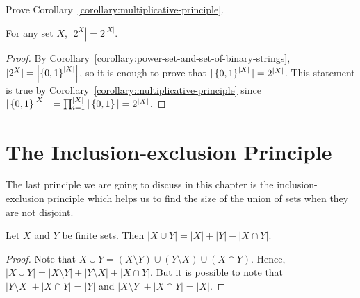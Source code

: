 \begin{exercise}
  Prove Corollary~\ref{corollary:multiplicative-principle}.
\end{exercise}

\begin{theorem}
\label{theorem:cardinality-of-power-set}
  For any set $X$, $|2^X| = 2^{|X|}$.
\end{theorem}
\begin{proof}
  By Corollary~\ref{corollary:power-set-and-set-of-binary-strings}, $|2^X| =
  \left|\set{0, 1}^{|X|}\right|$, so it is enough to prove that
  $|\set{0, 1}^{|X|}| = 2^{|X|}$. This statement is true by
  Corollary~\ref{corollary:multiplicative-principle} since $|\set{0, 1}^{|X|}| =
  \prod_{i = 1}^{|X|} |\set{0, 1}| = 2^{|X|}$.
\end{proof}

\section{The Inclusion-exclusion Principle}

The last principle we are going to discuss in this chapter is the
inclusion-exclusion principle which helps us to find the size of the union
of sets when they are not disjoint.
\begin{theorem}
\label{theorem:inclusion-exclusion-principle}
  Let $X$ and $Y$ be finite sets. Then $|X \cup Y| = |X| + |Y| - |X \cap Y|$.
\end{theorem}
\begin{proof}
  Note that $X \cup Y = (X \setminus Y) \cup (Y \setminus X) \cup (X \cap Y)$.
  Hence, $|X \cup Y| = |X \setminus Y| + |Y \setminus X| + |X \cap Y|$. But it
  is possible to note that $|Y \setminus X| + |X \cap Y| = |Y|$ and
  $|X \setminus Y| + |X \cap Y| = |X|$.
\end{proof}

